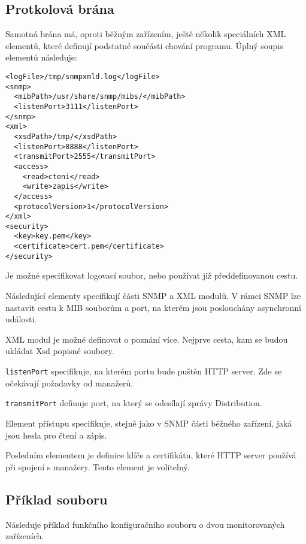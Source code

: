 \subsection*{Protkolová brána}
Samotná brána má, oproti běžným zařízením, ještě několik speciálních XML elementů, které definují podstatné
součásti chování programu. Úplný soupis elementů následuje:

\begin{verbatim}
<logFile>/tmp/snmpxmld.log</logFile>
<snmp>
  <mibPath>/usr/share/snmp/mibs/</mibPath>
  <listenPort>3111</listenPort>
</snmp>
<xml>
  <xsdPath>/tmp/</xsdPath>
  <listenPort>8888</listenPort>
  <transmitPort>2555</transmitPort>
  <access>
    <read>cteni</read>
    <write>zapis</write>
  </access>
  <protocolVersion>1</protocolVersion>
</xml>
<security>
  <key>key.pem</key>
  <certificate>cert.pem</certificate>
</security>
\end{verbatim}

Je možné specifikovat logovací soubor, nebo používat již předdefinovanou cestu.

Následující elementy specifikují části SNMP a XML modulů. V rámci SNMP lze nastavit
cestu k MIB souborům a port, na kterém jsou poslouchány asynchronní události.

XML modul je možné definovat o poznání více. Nejprve cesta, kam se budou ukládat
Xsd popisné soubory. 

\verb|listenPort| specifikuje, na kterém portu bude puštěn HTTP server. Zde se očekávají
požadavky od manažerů.

\verb|transmitPort| definuje port, na který se odesílají zprávy Distribution.

Element přístupu specifikuje, stejně jako v SNMP části běžného zařízení, jaká jsou hesla pro
čtení a zápis.

Posledním elementem je definice klíče a certifikátu, které HTTP server používá při spojení s manažery.
Tento element je volitelný.

\subsection*{Příklad souboru}
Následuje příklad funkčního konfiguračního souboru o dvou monitorovaných zařízeních.

